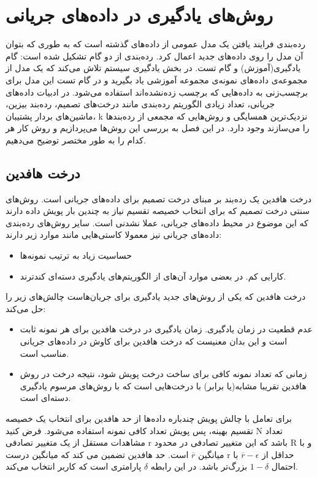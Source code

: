
\chapter{روش‌های یادگیری در داده‌های جریانی}
\thispagestyle{empty}

رده‌بندی فرایند یافتن یک مدل عمومی از داده‌های گذشته است که به طوری که بتوان آن مدل را روی داده‌های جدید اعمال کرد. رده‌بندی از دو گام تشکیل شده است: گام یادگیری(آموزش) و گام تست. در بخش یادگیری سیستم تلاش می‌کند که یک مدل از مجموعه‌ی داده‌های نمونه‌ی مجموعه آموزشی یاد بگیرید و در گام تست این مدل برای برچسب‌زنی به داده‌هایی که برچسب زده‌نشده‌اند استفاده می‌شود. در ادبیات داده‌های جریانی، تعداد زیادی الگوریتم رده‌بندی مانند درخت‌های تصمیم، رده‌بند بیزین، ماشین‌های بردار پشتیبان، k نزدیک‌ترین همسایگی و روش‌هایی که مجمعی از رده‌بندها را می‌سازند وجود دارد. در این فصل به بررسی این روش‌ها می‌پردازیم و روش کار هر کدام را به طور مختصر توضیح می‌دهیم.

\section{درخت هافدین}\label{sec3}
درخت هافدین یک رده‌بند بر مبنای درخت تصمیم برای داده‌های جریانی است. روش‌های سنتی درخت تصمیم که برای انتخاب خصیصه تقسیم نیاز به چندین بار پویش داده دارند که این موضوع در محیط داده‌های جریانی، عملا نشدنی است. سایر روش‌های رده‌بندی داده‌های جریانی نیز معمولا کاستی‌هایی مانند موارد زیر دارند:


\begin{itemize}
\item حساسیت زیاد به ترتیب نمونه‌ها
\item کارایی کم. در بعضی موارد آن‌های از الگوریتم‌های یادگیری دسته‌ای کندترند.
\end{itemize}
درخت هافدین که یکی از روش‌های جدید یادگیری برای جریان‌هاست چالش‌های زیر را حل می‌کند:

\begin{itemize}
\item عدم قطعیت در زمان یادگیری. زمان یادگیری در درخت هافدین برای هر نمونه ثابت است و این بدان معنیست که درخت هافدین برای کاوش در داده‌های جریانی مناسب است.
\item زمانی که تعداد نمونه کافی برای ساخت درخت پویش شود، نتیجه درخت‌ در روش هافدین تقریبا مشابه(یا برابر) با درخت‌هایی است که با روش‌های مرسوم یادگیری دسته‌ای است.
\end{itemize}

برای تعامل با چالش پویش چندباره داده‌ها از حد هافدین برای انتخاب یک خصیصه تقسیم بهینه، پس پویش تعداد کافی نمونه استفاده می‌شود. فرض کنید N تعداد مشاهدات مستقل از یک متغییر تصادفی r باشد که این متغییر تصادفی در محدود R و با میانگین $ \overline{r} $ است. حد هافدین تضمین می کند که میانگین درست r حداقل از $ \overline{r} -\epsilon $ با احتمال $ 1 - \delta $ بزرگ‌تر باشد. در این رابطه $ \delta $ پارامتری است که کاربر انتخاب می‌کند.

